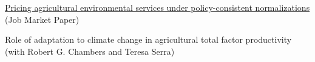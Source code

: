 
\href{https://sauravrajkunwar.github.io/documents/saurav_job_market_paper.pdf}{Pricing agricultural environmental services under policy-consistent normalizations} (Job Market Paper)
    
Role of adaptation to climate change in agricultural total factor productivity (with Robert G. Chambers and Teresa Serra)